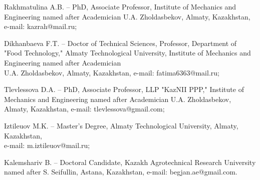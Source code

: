 \begin{noparindent}

Rakhmatulina A.B. -- PhD, Associate Professor, Institute of Mechanics
and Engineering named after Academician U.A. Zholdasbekov, Almaty,
Kazakhstan, e-mail: kazrah@mail.ru;

Dikhanbaeva F.T. -- Doctor of Technical Sciences, Professor, Department
of "Food Technology," Almaty Technological University, Institute of
Mechanics and Engineering named after Academician \\U.A. Zholdasbekov,
Almaty, Kazakhstan, e-mail: fatima6363@mail.ru;

Tlevlessova D.A. -- PhD, Associate Professor, LLP "KazNII PPP,"
Institute of Mechanics and Engineering named after Academician U.A.
Zholdasbekov, Almaty, Kazakhstan, e-mail: tlevlessova@gmail.com;

Iztileuov M.K. -- Master's Degree, Almaty Technological University,
Almaty, Kazakhstan, \\e-mail: m.iztileuov@mail.ru;

Kalemshariv B. -- Doctoral Candidate, Kazakh Agrotechnical Research
University named after S. Seifullin, Astana, Kazakhstan, e-mail:
begjan.ae@gmail.com.

\end{noparindent}



























